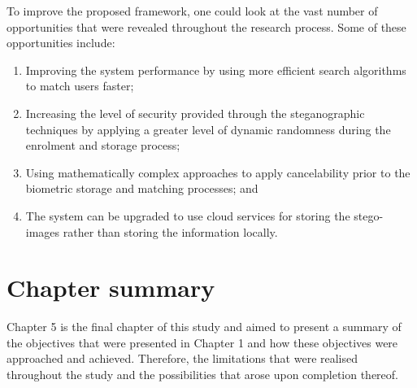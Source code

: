To improve the proposed framework, one could look at the vast number of opportunities that were revealed throughout the research process. Some of these opportunities include: 


\begin{enumerate}[label=\roman*.]
    \item Improving the system performance by using more efficient search algorithms to match users faster;
    \item Increasing the level of security provided through the steganographic techniques by applying a greater level of dynamic randomness during the enrolment and storage process; 
    \item Using mathematically complex approaches to apply cancelability prior to the biometric storage and matching processes; and
    \item The system can be upgraded to use cloud services for storing the stego-images rather than storing the information locally.
\end{enumerate}

\section{Chapter summary}

Chapter 5 is the final chapter of this study and aimed to present a summary of the objectives that were presented in Chapter 1 and how these objectives were approached and achieved. Therefore, the limitations that were realised throughout the study and the possibilities that arose upon completion thereof.